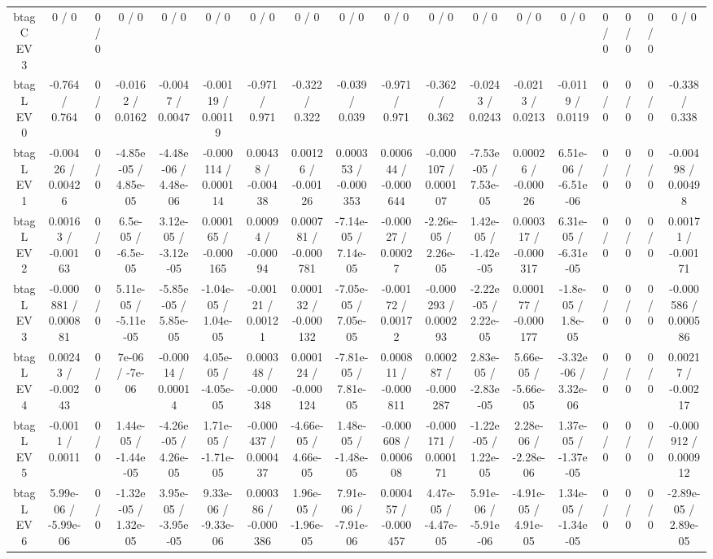 \documentclass[10pt]{article}
\begin{document}
\begin{table}[htbp]
\begin{center}
\begin{tabular}{|c|c|c|c|c|c|c|c|c|c|c|c|c|c|c|c|c|c|}
  btag C EV 3 & 0 / 0 & 0 / 0 & 0 / 0 & 0 / 0 & 0 / 0 & 0 / 0 & 0 / 0 & 0 / 0 & 0 / 0 & 0 / 0 & 0 / 0 & 0 / 0 & 0 / 0 & 0 / 0 & 0 / 0 & 0 / 0 & 0 / 0 \\ 
  btag L EV 0 & -0.764 / 0.764 & 0 / 0 & -0.0162 / 0.0162 & -0.0047 / 0.0047 & -0.00119 / 0.00119 & -0.971 / 0.971 & -0.322 / 0.322 & -0.039 / 0.039 & -0.971 / 0.971 & -0.362 / 0.362 & -0.0243 / 0.0243 & -0.0213 / 0.0213 & -0.0119 / 0.0119 & 0 / 0 & 0 / 0 & 0 / 0 & -0.338 / 0.338 \\ 
  btag L EV 1 & -0.00426 / 0.00426 & 0 / 0 & -4.85e-05 / 4.85e-05 & -4.48e-06 / 4.48e-06 & -0.000114 / 0.000114 & 0.00438 / -0.00438 & 0.00126 / -0.00126 & 0.000353 / -0.000353 & 0.000644 / -0.000644 & -0.000107 / 0.000107 & -7.53e-05 / 7.53e-05 & 0.00026 / -0.00026 & 6.51e-06 / -6.51e-06 & 0 / 0 & 0 / 0 & 0 / 0 & -0.00498 / 0.00498 \\ 
  btag L EV 2 & 0.00163 / -0.00163 & 0 / 0 & 6.5e-05 / -6.5e-05 & 3.12e-05 / -3.12e-05 & 0.000165 / -0.000165 & 0.00094 / -0.00094 & 0.000781 / -0.000781 & -7.14e-05 / 7.14e-05 & -0.00027 / 0.00027 & -2.26e-05 / 2.26e-05 & 1.42e-05 / -1.42e-05 & 0.000317 / -0.000317 & 6.31e-05 / -6.31e-05 & 0 / 0 & 0 / 0 & 0 / 0 & 0.00171 / -0.00171 \\ 
  btag L EV 3 & -0.000881 / 0.000881 & 0 / 0 & 5.11e-05 / -5.11e-05 & -5.85e-05 / 5.85e-05 & -1.04e-05 / 1.04e-05 & -0.00121 / 0.00121 & 0.000132 / -0.000132 & -7.05e-05 / 7.05e-05 & -0.00172 / 0.00172 & -0.000293 / 0.000293 & -2.22e-05 / 2.22e-05 & 0.000177 / -0.000177 & -1.8e-05 / 1.8e-05 & 0 / 0 & 0 / 0 & 0 / 0 & -0.000586 / 0.000586 \\ 
  btag L EV 4 & 0.00243 / -0.00243 & 0 / 0 & 7e-06 / -7e-06 & -0.00014 / 0.00014 & 4.05e-05 / -4.05e-05 & 0.000348 / -0.000348 & 0.000124 / -0.000124 & -7.81e-05 / 7.81e-05 & 0.000811 / -0.000811 & 0.000287 / -0.000287 & 2.83e-05 / -2.83e-05 & 5.66e-05 / -5.66e-05 & -3.32e-06 / 3.32e-06 & 0 / 0 & 0 / 0 & 0 / 0 & 0.00217 / -0.00217 \\ 
  btag L EV 5 & -0.0011 / 0.0011 & 0 / 0 & 1.44e-05 / -1.44e-05 & -4.26e-05 / 4.26e-05 & 1.71e-05 / -1.71e-05 & -0.000437 / 0.000437 & -4.66e-05 / 4.66e-05 & 1.48e-05 / -1.48e-05 & -0.000608 / 0.000608 & -0.000171 / 0.000171 & -1.22e-05 / 1.22e-05 & 2.28e-06 / -2.28e-06 & 1.37e-05 / -1.37e-05 & 0 / 0 & 0 / 0 & 0 / 0 & -0.000912 / 0.000912 \\ 
  btag L EV 6 & 5.99e-06 / -5.99e-06 & 0 / 0 & -1.32e-05 / 1.32e-05 & 3.95e-05 / -3.95e-05 & 9.33e-06 / -9.33e-06 & 0.000386 / -0.000386 & 1.96e-05 / -1.96e-05 & 7.91e-06 / -7.91e-06 & 0.000457 / -0.000457 & 4.47e-05 / -4.47e-05 & 5.91e-06 / -5.91e-06 & -4.91e-05 / 4.91e-05 & 1.34e-05 / -1.34e-05 & 0 / 0 & 0 / 0 & 0 / 0 & -2.89e-05 / 2.89e-05 \\ 

\end{tabular}
\end{center}
\end{table}
\end{document}

